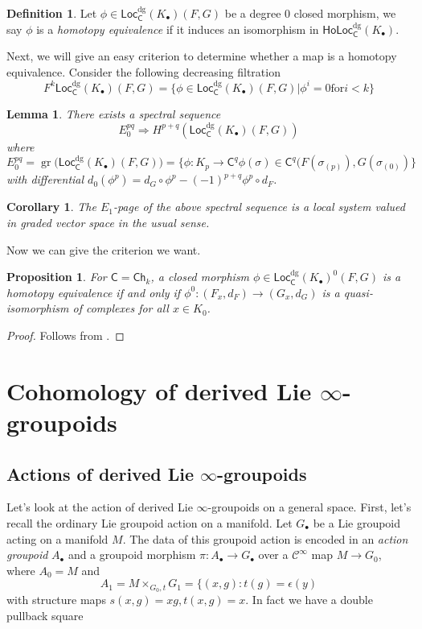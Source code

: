 \documentclass[12pt]{amsart}
\newtheorem{cor}[thm]{Corollary}
\newtheorem{lem}[thm]{Lemma}
\newtheorem{prop}[thm]{Proposition}
\theoremstyle{definition}
\newtheorem{defn}[thm]{Definition}
\theoremstyle{remark}
\numberwithin{equation}{section}
\newcommand{\CC}{{\mathsf C}}
\newcommand{\cinf}{{\mathcal C}^{\infty}}
\newcommand{\1}{{\mathbb{1}}}
\newcommand{\gr}{\operatorname{gr}}
\newcommand{\ho}{\mathsf{Ho}}
\newcommand{\Ch}{\mathsf{Ch}}
\newcommand{\Loc}{\mathsf{Loc}}
\newcommand{\bt}{\bullet}
\newcommand{\dg}{{\operatorname{dg}}}
\begin{document}
\begin{defn}
    Let $\phi\in \Loc^{\dg}_{\CC}(K_{\bt})(F, G)$ be a degree 0 closed morphism, we say $\phi$ is a {\it homotopy equivalence} if it induces an isomorphism in $\ho  \Loc^{\dg}_{\CC}(K_{\bt})$.
\end{defn}
Next, we will give an easy criterion to determine whether a map is a homotopy equivalence. Consider the following decreasing filtration
\begin{equation*}
    F^k\Loc^{\dg}_{\CC}(K_{\bt})(F, G) = \{ \phi \in \Loc^{\dg}_{\CC}(K_{\bt})(F, G)| \phi^i = 0 \text{for} i < k\}
\end{equation*}
\begin{lem}
    There exists a spectral sequence
    $$
    E^{pq}_0 \Longrightarrow H^{p+q}(\Loc^{\dg}_{\CC}(K_{\bt})(F, G))
    $$
    where
    $$
    E^{pq}_0 = \gr\big(\Loc^{\dg}_{\CC}(K_{\bt})(F, G)\big) = \{\phi: K_p \to \CC^q \phi(\sigma) \in \CC^q(F(\sigma_{(p)}), G(\sigma_{(0)})\}
    $$
    with differential $d_0(\phi^p) = d_G\circ \phi^p - (-1)^{p+q}\phi^p \circ d_F$.
\end{lem}
\begin{cor}
    The $E_1$-page of the above spectral sequence is a local system valued in graded vector space in the usual sense.
\end{cor}
Now we can give the criterion we want.
\begin{prop}
    For $\CC = \Ch_k$, a closed morphism $\phi \in \Loc^{\dg}_{\CC}(K_{\bt})^0(F, G)$ is a homotopy equivalence if and only if $\phi^0: (F_x, d_F) \to (G_x, d_G)$ is a quasi-isomorphism of complexes for all $x\in K_0$.
\end{prop}

\begin{proof}
    Follows from \cite[Proposition 2.9]{Blo05}.
\end{proof}
\section{Cohomology of derived Lie $\infty$-groupoids}
\subsection{Actions of derived Lie $\infty$-groupoids}
    Let's look at the action of derived Lie $\infty$-groupoids on a general space. First, let's recall the ordinary Lie groupoid action on a manifold. Let $G_{\bt}$ be a Lie groupoid acting on a manifold $M$. The data of this groupoid action is encoded in an {\it action groupoid} $A_{\bt}$ and a groupoid morphism $\pi: A_{\bt} \to G_{\bt}$ over a $\cinf$ map $M \to G_0$, where $A_0 = M$ and
    \begin{equation*}
        A_{1}= M\times_{G_0, t} G_1 = \{(x, g): t(g) = \epsilon(y)
    \end{equation*}
    with structure maps $s(x, g) = xg, t(x, g) = x$. In fact we have a double pullback square
    
\end{document}
